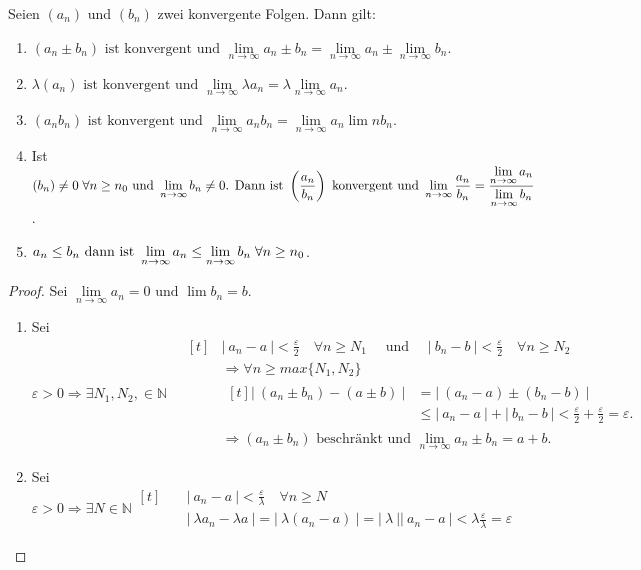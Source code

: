 \documentclass[a4paper,titlepage,oneside]{article}
\def\N{\ensuremath{\mathbb{N}} }
\renewcommand{\epsilon}{\ensuremath{\varepsilon} }
\def\sp{\hspace{0,1cm}}
\renewcommand{\liminf}[2][n]{\ensuremath{\lim\limits_{#1 \rightarrow \infty}{#2}}}
\newcommand{\abs}[1]{\ensuremath{\left|\:#1\:\right|}}
\theoremstyle{thmstyle}
\begin{document}
\newpage
\begin{subsatz}
Seien \((a_n)\) und \((b_n)\) zwei konvergente Folgen. Dann gilt:
\begin{enumerate}
\item \((a_n \pm b_n)\text{ ist konvergent und }\liminf{a_n  \pm  b_n} = \liminf{a_n}  \pm \liminf{b_n}\).
\item \(\lambda (a_n)\text{ ist konvergent und }\liminf{\lambda a_n} = \lambda \liminf{a_n}\).
\item \((a_n b_n)\text{ ist konvergent und }\liminf{a_n b_n} = \liminf{a_n} \lim{n}{b_n}\).
\item Ist $ \displaystyle (b_n) \ne 0 \sp \forall n \ge n_0\text{ und }\liminf{b_n} \ne 0\text{. Dann ist } \left(\frac{a_n}{b_n}\right) \text{ konvergent und }\liminf{\frac{a_n}{b_n}} = \frac{\liminf{a_n}}{\liminf{b_n}}$.
\item \(a_n \le b_n \text{ dann ist }\liminf{a_n} \le \liminf{b_n} \sp \forall n \ge n_0\).
\end{enumerate}
\begin{proof}
Sei \(\liminf{a_n} = 0\text{ und } \lim{b_n} = b\).
\begin{enumerate}
\item Sei $\epsilon > 0 \Rightarrow \exists N_1, N_2, \in \N \quad
\begin{aligned}[t]
&\abs{a_n - a} < \frac{\epsilon}{2} \quad \forall n \ge N_1 \quad \text{ und } \quad  \abs{b_n - b} < \frac{\epsilon}{2} \quad \forall n \ge N_2\\
&\Rightarrow \forall n \ge max\{N_1, N_2\}\\
& \begin{aligned}[t]
\abs{(a_n \pm b_n) - (a \pm b)} &= \abs{(a_n - a) \pm (b_n - b)} \\
&\le \abs{a_n - a} + \abs{b_n - b} < \frac{\epsilon}{2} + \frac{\epsilon}{2} = \epsilon.
\end{aligned}\\
&\Rightarrow (a_n \pm b_n) \text{ beschränkt und } \liminf{a_n \pm b_n} = a+b.
\end{aligned}$
\item Sei $ \displaystyle \epsilon > 0 \Rightarrow \exists N \in \N \begin{aligned}[t] \quad
		&\abs{a_n - a} < \frac{\epsilon}{\lambda} \quad \forall n \ge N\\
		& \abs{\lambda a_n - \lambda a} = \abs{\lambda(a_n - a)} = \abs{\lambda}\abs{a_n - a} < \lambda \frac{\epsilon}{\lambda} = \epsilon
		\end{aligned}$

\end{enumerate}
\end{proof}
\end{subsatz}
\end{document}
